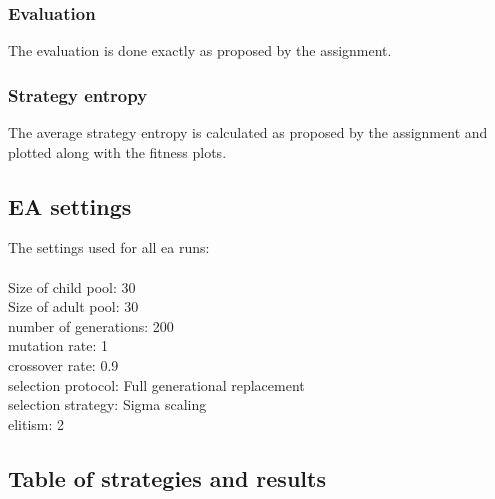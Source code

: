 \documentclass[11pt]{article}
\begin{document}
\subsubsection*{Evaluation}

The evaluation is done exactly as proposed by the assignment.

\subsubsection*{Strategy entropy}

The average strategy entropy is calculated as proposed by the assignment and plotted along with the 
fitness plots.

\subsection*{EA settings}

The settings used for all ea runs:\\
\\
Size of child pool: 30\\
Size of adult pool: 30\\
number of generations: 200\\
mutation rate: 1\\
crossover rate: 0.9\\
selection protocol: Full generational replacement\\
selection strategy: Sigma scaling\\
elitism: 2\\

\subsection*{Table of strategies and results}
\end{document}

